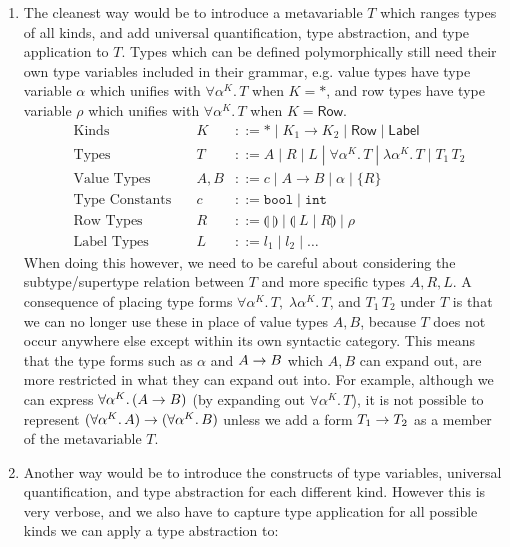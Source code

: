 \documentclass[acmsmall, 9pt]{article}
\begin{document}
\begin{enumerate}
  \item The cleanest way would be to introduce a metavariable $T$ which ranges types of all kinds, and add universal quantification, type abstraction, and type application to $T$. Types which can be defined polymorphically still need their own type variables included in their grammar, e.g. value types have type variable $\alpha$ which unifies with $\forall \alpha^K.\, T$ when $K = *$, and row types have type variable  $\rho$ which unifies with $\forall \alpha^K.\, T$ when $K = \mathsf{Row}$.
  \begin{align*}
   &\text{Kinds} \quad &K &::= * \; | \; K_1 \rightarrow K_2 \; | \; \mathsf{Row} \; | \; \mathsf{Label}\\
   &\text{Types} \quad &T &::= A \; | \; R \; | \; L \; | \; \forall \alpha^K . \, T\; | \; \lambda \alpha^K. \, T \; | \; T_1 \, T_2\\
   &\text{Value Types} \quad  &A, B &::= c \; | \; A \rightarrow B \;  | \; \alpha \; |  \; \{ R \} \\
   &\text{Type Constants} \quad &c &::= \texttt{bool} \; | \; \texttt{int}\\
   &\text{Row Types} \quad &R &::= \llparenthesis \; \rrparenthesis \; | \; \llparenthesis \; L \; | \; R \rrparenthesis \; | \; \rho \\
   &\text{Label Types} \quad &L &::= l_1 \; | \; l_2 \; | \; \ldots
  \end{align*}
  When doing this however, we need to be careful about considering the subtype/supertype relation between $T$ and more specific types $A, R, L$. A consequence of placing type forms $ \forall \alpha^K . \, T, \; \lambda \alpha^K. \, T$, and $T_1 \, T_2$ under $T$ is that we can no longer use these in place of value types $A, B$, because $T$ does not occur anywhere else except within its own syntactic category. This means that the type forms such as $\alpha$ and ${A}\rightarrow{B}$ which $A, B$ can expand out, are more restricted in what they can expand out into. For example, although we can express $\forall \alpha^K. \, ({A}\rightarrow{B})$ (by expanding out $\forall \alpha^K. \, T$), it is not possible to represent ${(\forall \alpha^K. \, A)}\rightarrow{(\forall \alpha^K. \, B)}$ unless we add a form ${T_1}\rightarrow{T_2}$ as a member of the metavariable $T$.
  \item Another way would be to introduce the constructs of type variables, universal quantification, and type abstraction for each different kind. However this is very verbose, and we also have to capture type application for all possible kinds we can apply a type abstraction to:

\end{enumerate}
\end{document}
